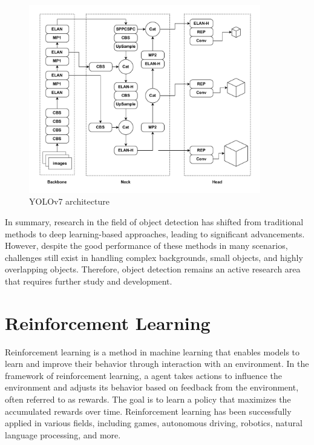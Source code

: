 \documentclass[PhD]{PHlab-thesis}
\begin{document}
\begin{figure}[H]
    \centering 
    \includegraphics[width=0.9\textwidth]{images/YOLOv7 architecture.pdf}
    \caption{YOLOv7 architecture} 
    \label{Fig.YOLOv7 architecture} 
\end{figure}

In summary, research in the field of object detection has shifted from traditional methods to deep learning-based approaches, leading to significant advancements. However, despite the good performance of these methods in many scenarios, challenges still exist in handling complex backgrounds, small objects, and highly overlapping objects. Therefore, object detection remains an active research area that requires further study and development.

\section{Reinforcement Learning}
Reinforcement learning is a method in machine learning that enables models to learn and improve their behavior through interaction with an environment. In the framework of reinforcement learning, a agent takes actions to influence the environment and adjusts its behavior based on feedback from the environment, often referred to as rewards. The goal is to learn a policy that maximizes the accumulated rewards over time. Reinforcement learning has been successfully applied in various fields, including games, autonomous driving, robotics, natural language processing, and more.
\end{document}

